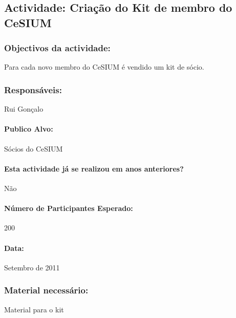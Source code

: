 \subsection{Actividade: Criação do Kit de membro do CeSIUM} %

\subsubsection*{Objectivos da actividade:}
Para cada novo membro do CeSIUM é vendido um kit de sócio.

\subsubsection*{Responsáveis:}
\begin{itemizedash}
	\item{Rui Gonçalo}
\end{itemizedash}

\paragraph{Publico Alvo: }
Sócios do CeSIUM

\paragraph{Esta actividade já se realizou em anos anteriores?}
Não

\paragraph{Número de Participantes Esperado:}
200

\paragraph{Data:} Setembro de 2011

\subsubsection*{Material necessário:}
\begin{itemizedash}
	\item{Material para o kit}
\end{itemizedash}


